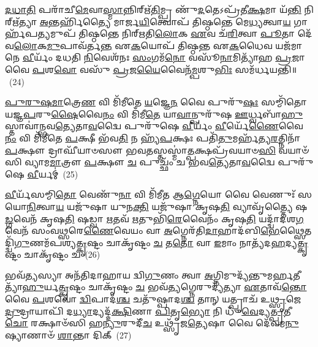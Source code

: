 \-\ul{𑌦}\-\-\ul{𑌧𑌾}\-\-\ul{𑌤𑌿} 𑌪𑌰𑌾᳴𑌚𑍀\-\ul{𑌮𑍇}\-𑌵𑌾\-\ul{𑌸𑍍𑌮𑌾}\-𑌨𑍍𑌨𑌿𑌰𑍍\mbox{}𑌋᳴\-\ul{𑌤𑌿}\-𑌮𑍍𑌪𑍍𑌰 𑌣𑍁᳴\-\ul{𑌦}\-𑌤𑍇\-𑌽𑌪𑍍𑌰᳴𑌤𑍀\-\ul{𑌕𑍍𑌷}\-𑌮𑌾 𑌯᳴\-\ul{𑌨𑍍𑌤𑌿} 𑌨𑌿𑌰𑍍\mbox{}𑌋᳴𑌤𑍍𑌯𑌾 \ul{𑌅}\-𑌨𑍍𑌤𑌰𑍍\mbox{}𑌹𑌿᳴𑌤𑍍𑌯𑍈 𑌮𑌾𑌰𑍍𑌜\-\ul{𑌯𑌿}\-𑌤𑍍𑌵𑍋𑌪᳴ 𑌤𑌿𑌷𑍍𑌠𑌨𑍍𑌤𑍇 𑌮𑍇\-\ul{𑌧𑍍𑌯}\-𑌤𑍍𑌵𑌾\-\ul{𑌯} 𑌗𑌾𑌰𑍍\mbox{}𑌹᳴𑌪\-\ul{𑌤𑍍𑌯}\-𑌮𑍁𑌪᳴ 𑌤𑌿𑌷𑍍𑌠𑌨𑍍𑌤𑍇 𑌨𑌿𑌰𑍍\mbox{}𑌋𑌤𑌿\-\ul{𑌲𑍋}\-𑌕 \ul{𑌏}\-𑌵 𑌚᳴\-\ul{𑌰𑌿}\-𑌤𑍍𑌵𑌾 \ul{𑌪𑍂}\-𑌤𑌾 𑌦𑍇᳴𑌵\-\ul{𑌲𑍋}\-𑌕\-\ul{𑌮𑍁}\-𑌪𑌾𑌵᳴𑌰𑍍𑌤\-\ul{𑌨𑍍𑌤} 𑌏\-\ul{𑌕}\-𑌯𑍋𑌪᳴ 𑌤𑌿𑌷𑍍𑌠𑌨𑍍𑌤 𑌏\-\ul{𑌕}\-𑌧𑍈𑌵 𑌯𑌜᳴𑌮𑌾𑌨𑍇 \ul{𑌵𑍀}\-𑌰𑍍𑌯𑌂᳴ 𑌦𑌧𑌤𑌿 \ul{𑌨𑌿}\-𑌵𑍇𑌶᳴𑌨𑌃 \ul{𑌸𑌂}\-𑌗𑌮᳴\-\ul{𑌨𑍋} 𑌵𑌸𑍂᳴\-\ul{𑌨𑌾}\-𑌮𑌿𑌤𑍍𑌯𑌾᳴𑌹 \ul{𑌪𑍍𑌰}\-𑌜𑌾 𑌵𑍈 \ul{𑌪}\-𑌶\-\ul{𑌵𑍋} 𑌵𑌸𑍁᳴ \ul{𑌪𑍍𑌰}\-𑌜\-\ul{𑌯𑍈}\-𑌵𑍈𑌨᳴\-\ul{𑌮𑍍𑌪}\-𑌶𑍁\-\ul{𑌭𑌿𑌃} 𑌸𑌮᳴𑌰𑍍𑌧𑌯𑌨𑍍𑌤𑌿॥~(24)

{\anuvakamend[{\-\ul{𑌋}\-𑌤𑍁𑌭𑌿᳴\-\ul{𑌰𑍇}\-𑌷𑌾 𑌪𑌰𑌾᳴\-\ul{𑌚𑍀}\-𑌰𑍁\-\ul{𑌪𑌾}\-𑌷𑍍𑌟𑌾𑌚᳴𑌤𑍍𑌵𑌾𑌰𑌿𑍞𑌶𑌚𑍍𑌚}]}%

\-\ul{𑌪𑍁}\-\-\ul{𑌰𑍁}\-\-\ul{𑌷}\-\-\ul{𑌮𑌾}\-𑌤𑍍𑌰𑍇\-\ul{𑌣} 𑌵𑌿 𑌮𑌿᳴𑌮𑍀𑌤𑍇 \ul{𑌯}\-𑌜𑍍𑌞𑍇\-\ul{𑌨} 𑌵𑍈 𑌪𑍁𑌰𑍁᳴\-\ul{𑌷𑌃} 𑌸𑌮𑍍𑌮𑌿᳴𑌤𑍋 𑌯𑌜𑍍𑌞\-\ul{𑌪}\-𑌰𑍁\-\ul{𑌷𑍈}\-𑌵𑍈\-\ul{𑌨𑌂} 𑌵𑌿 𑌮𑌿᳴𑌮𑍀\-\ul{𑌤𑍇} 𑌯𑌾\-\ul{𑌵𑌾}\-𑌨𑍍𑌪𑍁𑌰𑍁᳴𑌷 \ul{𑌊}\-𑌰𑍍𑌧𑍍𑌵𑌬𑌾᳴\-\ul{𑌹𑍁}\-𑌸𑍍𑌤𑌾𑌵𑌾॑𑌨𑍍𑌭𑌵\-\-\ul{𑌤𑍍𑌯𑍇}\-𑌤𑌾\-\ul{𑌵}\-𑌦𑍍𑌵𑍈 𑌪𑍁𑌰𑍁᳴𑌷𑍇 \ul{𑌵𑍀}\-𑌰𑍍𑌯𑌂᳴ \ul{𑌵𑍀}\-𑌰𑍍𑌯𑍇᳴\-\ul{𑌣𑍈}\-𑌵𑍈\-\ul{𑌨𑌂} 𑌵𑌿 𑌮𑌿᳴𑌮𑍀𑌤𑍇 \ul{𑌪}\-𑌕𑍍𑌷𑍀 𑌭᳴𑌵\-\ul{𑌤𑌿} 𑌨 𑌹𑍍𑌯᳴\-\ul{𑌪}\-𑌕𑍍𑌷𑌃 𑌪𑌤𑌿᳴\-\ul{𑌤𑍁}\-𑌮𑌰𑍍\mbox{}𑌹᳴𑌤𑍍𑌯\-\ul{𑌰}\-𑌤𑍍𑌨𑌿𑌨𑌾᳴ \ul{𑌪}\-𑌕𑍍𑌷𑍗 𑌦𑍍𑌰𑌾𑌘𑍀᳴𑌯𑌾𑍞𑌸𑍗 𑌭𑌵\-\ul{𑌤}\-𑌸𑍍𑌤𑌸𑍍𑌮𑌾॑\-\ul{𑌤𑍍𑌪}\-𑌕𑍍𑌷𑌪𑍍𑌰᳴𑌵𑌯𑌾𑍞\-\ul{𑌸𑌿} 𑌵𑌯𑌾𑍞᳴𑌸𑌿 𑌵𑍍𑌯𑌾𑌮\-\ul{𑌮𑌾}\-𑌤𑍍𑌰𑍗 \ul{𑌪}\-𑌕𑍍𑌷𑍗 \ul{𑌚} 𑌪𑍁𑌚𑍍𑌛𑌂᳴ 𑌚 𑌭𑌵\-\ul{𑌤𑍍𑌯𑍇}\-𑌤𑌾\-\ul{𑌵}\-𑌦𑍍𑌵𑍈 𑌪𑍁𑌰𑍁᳴𑌷𑍇 \ul{𑌵𑍀}\-𑌰𑍍𑌯𑌮𑍍॑~(25)

\-\ul{𑌵𑍀}\-𑌰𑍍𑌯᳴𑌸𑌮𑍍𑌮𑌿\-\ul{𑌤𑍋} 𑌵𑍇𑌣𑍁᳴\-\ul{𑌨𑌾} 𑌵𑌿 𑌮𑌿᳴𑌮𑍀𑌤 𑌆\-\ul{𑌗𑍍𑌨𑍇}\-𑌯𑍋 𑌵𑍈 𑌵𑍇𑌣𑍁𑌃᳴ 𑌸𑌯𑍋\-\ul{𑌨𑌿}\-𑌤𑍍𑌵𑌾\-\ul{𑌯} 𑌯𑌜𑍁᳴𑌷𑌾 𑌯𑍁𑌨\-\ul{𑌕𑍍𑌤𑌿} 𑌯𑌜𑍁᳴𑌷𑌾 𑌕𑍃𑌷\-\ul{𑌤𑌿} 𑌵𑍍𑌯𑌾𑌵𑍃᳴𑌤𑍍𑌤𑍍𑌯𑍈 𑌷\-\ul{𑌡𑍍𑌗}\-𑌵𑍇𑌨᳴ 𑌕𑍃𑌷\-\ul{𑌤𑌿} 𑌷𑌡𑍍𑌵𑌾 \ul{𑌋}\-𑌤𑌵᳴ \ul{𑌋}\-𑌤𑍁𑌭𑌿᳴\-\ul{𑌰𑍇}\-𑌵𑍈𑌨𑌂᳴ 𑌕𑍃𑌷\-\ul{𑌤𑌿} 𑌯𑌦𑍍𑌦𑍍𑌵𑌾᳴𑌦𑌶\-\ul{𑌗}\-𑌵𑍇𑌨᳴ 𑌸𑌂𑌵\-\ul{𑌥𑍍𑌸}\-𑌰𑍇\-\ul{𑌣𑍈}\-𑌵𑍇𑌯𑌂 𑌵𑌾 \ul{𑌅}\-𑌗𑍍𑌨𑍇𑌰᳴𑌤𑌿\-\ul{𑌦𑌾}\-𑌹𑌾𑌦᳴𑌬𑌿\-\ul{𑌭𑍇}\-𑌥𑍍𑌸𑍈𑌤𑌦𑍍𑌦𑍍𑌵𑌿᳴\-\ul{𑌗𑍁}\-𑌣𑌮᳴𑌪𑌶𑍍𑌯\-\ul{𑌤𑍍𑌕𑍃}\-𑌷𑍍𑌟𑌂 𑌚𑌾𑌕𑍃᳴𑌷𑍍𑌟𑌂 \ul{𑌚} 𑌤\-\ul{𑌤𑍋} 𑌵𑌾 \ul{𑌇}\-𑌮𑌾𑌂 𑌨𑌾𑌤𑍍𑌯᳴𑌦\-\ul{𑌹}\-𑌦𑍍𑌯\-\ul{𑌤𑍍𑌕𑍃}\-𑌷𑍍𑌟𑌂 𑌚𑌾𑌕𑍃᳴𑌷𑍍𑌟𑌂 𑌚~(26)

𑌭𑌵᳴\-\ul{𑌤𑍍𑌯}\-𑌸𑍍𑌯𑌾 𑌅𑌨᳴𑌤𑌿𑌦𑌾𑌹𑌾𑌯 𑌦𑍍𑌵𑌿\-\ul{𑌗𑍁}\-𑌣𑌂 𑌤𑍍𑌵𑌾 \ul{𑌅}\-𑌗𑍍𑌨𑌿𑌮𑍁𑌦𑍍𑌯᳴𑌨𑍍𑌤𑍁𑌮𑌰𑍍\mbox{}\-\ul{𑌹}\-𑌤𑍀𑌤𑍍𑌯𑌾᳴\-\ul{𑌹𑍁}\-𑌰𑍍𑌯\-\ul{𑌤𑍍𑌕𑍃}\-𑌷𑍍𑌟𑌂 𑌚𑌾𑌕𑍃᳴𑌷𑍍𑌟𑌂 \ul{𑌚} 𑌭𑌵᳴\-\ul{𑌤𑍍𑌯}\-𑌗𑍍𑌨𑍇𑌰𑍁𑌦𑍍𑌯᳴𑌤𑍍𑌯𑌾 \ul{𑌏}\-𑌤𑌾𑌵᳴\-\ul{𑌨𑍍𑌤𑍋} 𑌵𑍈 \ul{𑌪}\-𑌶𑌵𑍋॑ \ul{𑌦𑍍𑌵𑌿}\-𑌪𑌾𑌦᳴\-\ul{𑌶𑍍𑌚} 𑌚𑌤𑍁᳴𑌷𑍍𑌪𑌾𑌦\-\ul{𑌶𑍍𑌚} 𑌤𑌾𑌨𑍍 𑌯𑌤𑍍𑌪𑍍𑌰𑌾𑌚᳴ 𑌉\-\ul{𑌥𑍍𑌸𑍃}\-𑌜𑍇\-\ul{𑌦𑍍𑌰𑍁}\-𑌦𑍍𑌰𑌾𑌯𑌾𑌪𑌿᳴ 𑌦\-\ul{𑌧𑍍𑌯𑌾}\-𑌦𑍍𑌯𑌦𑍍𑌦᳴\-\ul{𑌕𑍍𑌷𑌿}\-𑌣𑌾 \ul{𑌪𑌿}\-𑌤𑍃\-\ul{𑌭𑍍𑌯𑍋} 𑌨𑌿 𑌧𑍁᳴\-\ul{𑌵𑍇}\-𑌦𑍍𑌯\-\ul{𑌤𑍍𑌪𑍍𑌰}\-𑌤𑍀\-\ul{𑌚𑍋} 𑌰𑌕𑍍𑌷𑌾𑍞᳴𑌸𑌿 𑌹\-\ul{𑌨𑍍𑌯𑍁}\-𑌰𑍁𑌦𑍀᳴\-\ul{𑌚} 𑌉𑌥𑍍𑌸𑍃᳴𑌜\-\ul{𑌤𑍍𑌯𑍇}\-𑌷𑌾 𑌵𑍈 𑌦𑍇᳴𑌵𑌮\-\ul{𑌨𑍁}\-𑌷𑍍𑌯𑌾𑌣𑌾𑍞᳴ \ul{𑌶𑌾}\-𑌨𑍍𑌤𑌾 𑌦𑌿𑌕𑍍~(27)

